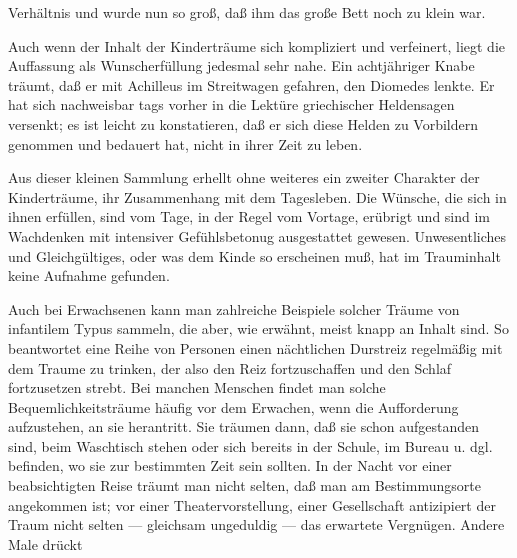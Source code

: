 \documentclass{article}
\begin{document}
         
            
            
            
        \pstart
        Verhältnis und wurde nun so groß, daß ihm das große Bett noch zu
               klein war.
        \pend
    
            
        \pstart
        Auch wenn der Inhalt der Kinderträume sich kompliziert und verfeinert, liegt die
               Auffassung als Wunscherfüllung jedesmal sehr nahe. Ein achtjähriger Knabe
               träumt, daß er mit Achilleus im Streitwagen gefahren, den Diomedes lenkte. Er
               hat sich nachweisbar tags vorher in die Lektüre griechischer
               Heldensagen versenkt; es ist leicht zu konstatieren, daß er sich
               diese Helden zu Vorbildern genommen und bedauert hat, nicht in ihrer Zeit
               zu leben.
        \pend
    
            
        \pstart
        Aus dieser kleinen Sammlung erhellt ohne weiteres ein zweiter Charakter der
               Kinderträume, ihr Zusammenhang mit dem Tagesleben.
               Die Wünsche, die sich in ihnen erfüllen, sind vom Tage, in der Regel vom
               Vortage, erübrigt und sind im Wachdenken mit intensiver Gefühlsbetonug
               ausgestattet gewesen. Unwesentliches und Gleichgültiges, oder was dem Kinde
               so erscheinen muß, hat im Trauminhalt keine Aufnahme gefunden.
        \pend
    
            
        \pstart
        Auch bei Erwachsenen kann man zahlreiche Beispiele solcher Träume von infantilem
               Typus sammeln, die aber, wie erwähnt, meist knapp an Inhalt sind. So beantwortet
               eine Reihe von Personen einen nächtlichen Durstreiz regelmäßig mit
               dem Traume zu trinken, der also den Reiz fortzuschaffen und den Schlaf fortzusetzen strebt. Bei manchen Menschen findet man solche
               Bequemlichkeitsträume häufig vor dem Erwachen,
               wenn die Aufforderung aufzustehen, an sie herantritt. Sie träumen dann, daß
               sie schon aufgestanden sind, beim Waschtisch stehen oder sich bereits in der
               Schule, im Bureau u. dgl. befinden, wo sie zur bestimmten Zeit sein sollten. In
               der Nacht vor einer beabsichtigten Reise träumt man nicht selten, daß man
               am Bestimmungsorte angekommen ist; vor einer Theatervorstellung, einer
               Gesellschaft antizipiert der Traum nicht selten — gleichsam
               ungeduldig — das erwartete Vergnügen. Andere Male drückt
        \pend
    
\end{document}
